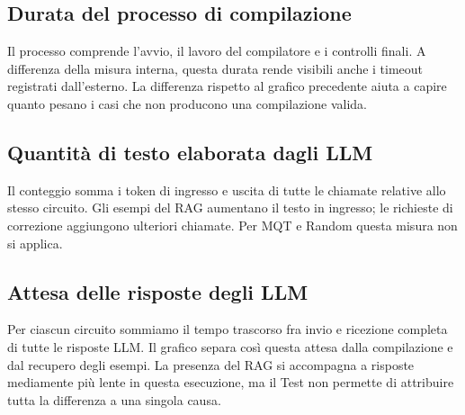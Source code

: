\clearpage{}\begin{landscape}\pagestyle{empty}\TestLandscapePagetrue
\subsection{Durata del processo di compilazione}
Il processo comprende l’avvio, il lavoro del compilatore e i controlli finali. A differenza della misura interna, questa durata rende visibili anche i timeout registrati dall’esterno. La differenza rispetto al grafico precedente aiuta a capire quanto pesano i casi che non producono una compilazione valida.

\begin{center}

\end{center}\end{landscape}\restoregeometry
\clearpage{}\begin{landscape}\pagestyle{empty}\TestLandscapePagetrue
\subsection{Quantità di testo elaborata dagli LLM}
Il conteggio somma i token di ingresso e uscita di tutte le chiamate relative allo stesso circuito. Gli esempi del RAG aumentano il testo in ingresso; le richieste di correzione aggiungono ulteriori chiamate. Per MQT e Random questa misura non si applica.

\begin{center}

\end{center}\end{landscape}\restoregeometry
\clearpage{}\begin{landscape}\pagestyle{empty}\TestLandscapePagetrue
\subsection{Attesa delle risposte degli LLM}
Per ciascun circuito sommiamo il tempo trascorso fra invio e ricezione completa di tutte le risposte LLM. Il grafico separa così questa attesa dalla compilazione e dal recupero degli esempi. La presenza del RAG si accompagna a risposte mediamente più lente in questa esecuzione, ma il Test non permette di attribuire tutta la differenza a una singola causa.

\begin{center}

\end{center}\end{landscape}\restoregeometry

